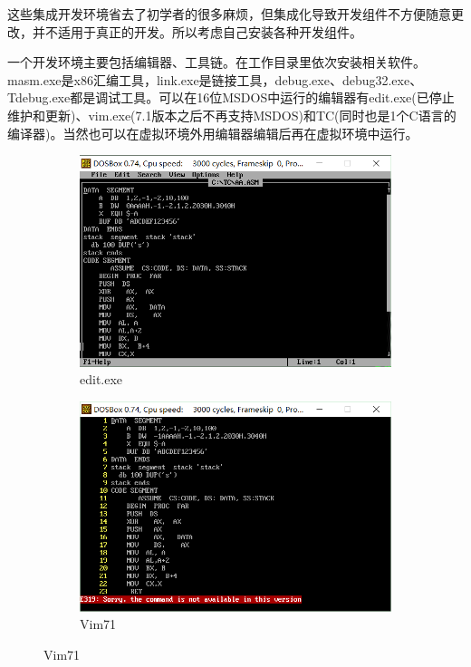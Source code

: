 \documentclass{ctexart}
\begin{document}
	这些集成开发环境省去了初学者的很多麻烦，但集成化导致开发组件不方便随意更改，并不适用于真正的开发。所以考虑自己安装各种开发组件。

	一个开发环境主要包括编辑器、工具链。在工作目录里依次安装相关软件。masm.exe是x86汇编工具，link.exe是链接工具，debug.exe、debug32.exe、Tdebug.exe都是调试工具。可以在16位MSDOS中运行的编辑器有edit.exe(已停止维护和更新)、vim.exe(7.1版本之后不再支持MSDOS)和TC(同时也是1个C语言的编译器)。当然也可以在虚拟环境外用编辑器编辑后再在虚拟环境中运行。

	\begin{figure}[htpb]
		\centering
		\begin{subfigure}[htpb]{.8\linewidth}
			\centering
			\includegraphics[width=\linewidth]{edit.png}
			\caption{edit.exe}
			\label{fig:edit.exe}
		\end{subfigure}

		\begin{subfigure}[htpb]{.8\linewidth}
			\centering
			\includegraphics[width=\linewidth]{Vim71.png}
			\caption{Vim71}
			\label{fig:Vim71}
		\end{subfigure}
	\end{figure}
\end{document}

